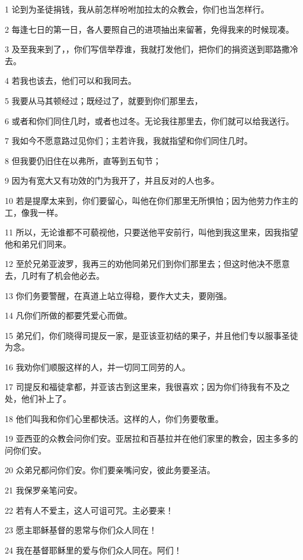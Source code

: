 \par 1 论到为圣徒捐钱，我从前怎样吩咐加拉太的众教会，你们也当怎样行。
\par 2 每逢七日的第一日，各人要照自己的进项抽出来留著，免得我来的时候现凑。
\par 3 及至我来到了，，你们写信举荐谁，我就打发他们，把你们的捐资送到耶路撒冷去。
\par 4 若我也该去，他们可以和我同去。
\par 5 我要从马其顿经过；既经过了，就要到你们那里去，
\par 6 或者和你们同住几时，或者也过冬。无论我往那里去，你们就可以给我送行。
\par 7 我如今不愿意路过见你们；主若许我，我就指望和你们同住几时。
\par 8 但我要仍旧住在以弗所，直等到五旬节；
\par 9 因为有宽大又有功效的门为我开了，并且反对的人也多。
\par 10 若是提摩太来到，你们要留心，叫他在你们那里无所惧怕；因为他劳力作主的工，像我一样。
\par 11 所以，无论谁都不可藐视他，只要送他平安前行，叫他到我这里来，因我指望他和弟兄们同来。
\par 12 至於兄弟亚波罗，我再三的劝他同弟兄们到你们那里去；但这时他决不愿意去，几时有了机会他必去。
\par 13 你们务要警醒，在真道上站立得稳，要作大丈夫，要刚强。
\par 14 凡你们所做的都要凭爱心而做。
\par 15 弟兄们，你们晓得司提反一家，是亚该亚初结的果子，并且他们专以服事圣徒为念。
\par 16 我劝你们顺服这样的人，并一切同工同劳的人。
\par 17 司提反和福徒拿都，并亚该古到这里来，我很喜欢；因为你们待我有不及之处，他们补上了。
\par 18 他们叫我和你们心里都快活。这样的人，你们务要敬重。
\par 19 亚西亚的众教会问你们安。亚居拉和百基拉并在他们家里的教会，因主多多的问你们安。
\par 20 众弟兄都问你们安。你们要亲嘴问安，彼此务要圣洁。
\par 21 我保罗亲笔问安。
\par 22 若有人不爱主，这人可诅可咒。主必要来！
\par 23 愿主耶稣基督的恩常与你们众人同在！
\par 24 我在基督耶稣里的爱与你们众人同在。阿们！


